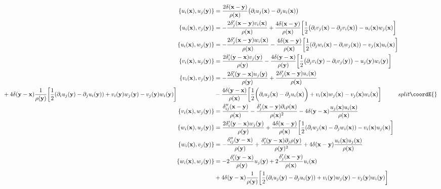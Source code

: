 \documentclass[a4paper,aps,prd,preprint,groupedaddress]{revtex4}
\begin{document}
\begin{equation}
{\begin{split}
&+4\delta({\bf y}-{\bf x})\frac{1}{\rho({\bf y})}\biggl[\frac{1}{2}(\partial_iu_j({\bf y})-\partial_ju_i({\bf y}))+v_i({\bf y})w_j({\bf y})-v_j({\bf y})w_i({\bf y})\biggr]\\
\end{split}
}{
\begin{split}
\{u_i({\bf x}), u_j({\bf y})\}&=\frac{2\delta({\bf x}-{\bf y})}{\rho({\bf x})}\bigl(\partial_i u_j({\bf x})-\partial_j u_i({\bf x})\bigr)\\
\{u_i({\bf x}), v_j({\bf y})\}&=-\frac{2\delta_j'({\bf x}-{\bf y})v_i({\bf x})}{\rho({\bf x})}
+\frac{4\delta({\bf x}-{\bf y})}{\rho({\bf x})}\biggl[\frac{1}{2}\bigl(\partial_iv_j({\bf x})-\partial_jv_i({\bf x})\bigr) -u_i({\bf x})w_j({\bf x})\biggr]\\
\{ u _i({\bf x}),w_j({\bf y})\}&=-\frac{2\delta_j'({\bf x}-{\bf y})w_i({\bf x})}{\rho({\bf x})}-\frac{4\delta({\bf x}-{\bf y})}{\rho({\bf x})}\biggl[\frac{1}{2}(\partial_jw_i({\bf x})-\partial_iw_j({\bf x})) -v_j({\bf x})u_i({\bf x})\biggr]\\
\{v_i({\bf x}), u_j({\bf y})\}&=\frac{2\delta_i'({\bf y}-{\bf x})v_j({\bf y})}{\rho({\bf y})}
-\frac{4\delta({\bf y}-{\bf x})}{\rho({\bf y})}\biggl[\frac{1}{2}\bigl(\partial_jv_i({\bf y})-\partial_iv_j({\bf y})\bigr) -u_j({\bf y})w_i({\bf y})\biggr]\\
\{v_i({\bf x}), v_j({\bf y})\}&=-\frac{2\delta_i'({\bf y}-{\bf x})u_j({\bf y})}{\rho({\bf y})}+\frac{2\delta_j'({\bf x}-{\bf y})u_i({\bf x})}{\rho({\bf x})}\\
&-\frac{4\delta({\bf y}-{\bf x})}{\rho({\bf x})}\biggl[\frac{1}{2}\biggl(\partial_iu_j({\bf x})-\partial_ju_i({\bf x})\biggr)+v_i({\bf x})w_j({\bf x})-v_j({\bf x})w_i({\bf x})\biggr]\\
\{v_i({\bf x}), w _j({\bf y})\}&=\frac{\delta_{ij}''({\bf x}-{\bf y})}{\rho({\bf x})}-\frac{\delta_j'({\bf x}-{\bf y})\partial_i\rho({\bf x})}{\rho({\bf x})^2}
-4\delta({\bf y}-{\bf x})\frac{u_j({\bf x})u_i({\bf x})}{\rho({\bf x})}\\
\{w_i({\bf x}), u _j({\bf y})\}&=\frac{2\delta_i'({\bf y}-{\bf x})w_j({\bf y})}{\rho({\bf y})}+\frac{4\delta({\bf x}-{\bf y})}{\rho({\bf x})}\biggl[\frac{1}{2}(\partial_iw_j({\bf x})-\partial_jw_i({\bf x})) -v_i({\bf x})u_j({\bf x})\biggr]\\
\{w_i({\bf x}), v _j({\bf y})\}&=-\frac{\delta_{ij}''({\bf y}-{\bf x})}{\rho({\bf y})}+\frac{\delta_i'({\bf y}-{\bf x})\partial_j\rho({\bf y})}{\rho({\bf y})^2}
+4\delta({\bf x}-{\bf y})\frac{u_i({\bf x})u_j({\bf x})}{\rho({\bf x})}\\
\{w_i({\bf x}), w_j({\bf y})\}&=-2\frac{\delta_i'({\bf y}-{\bf x})}{\rho({\bf y})}u_j({\bf y})+2\frac{\delta_j'({\bf x}-{\bf y})}{\rho({\bf x})}u_i({\bf x})\\
&+4\delta({\bf y}-{\bf x})\frac{1}{\rho({\bf y})}\biggl[\frac{1}{2}(\partial_iu_j({\bf y})-\partial_ju_i({\bf y}))+v_i({\bf y})w_j({\bf y})-v_j({\bf y})w_i({\bf y})\biggr]\\
\end{split}
}{split}\coordE{}\end{equation}
\end{document}
